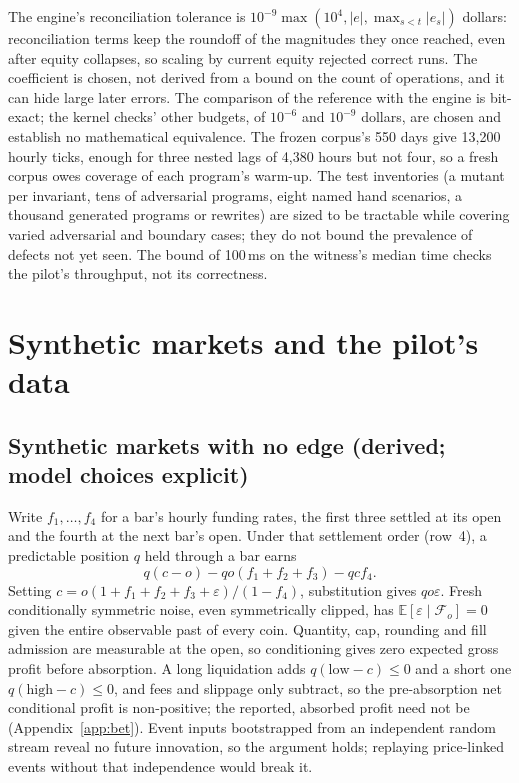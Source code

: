 \documentclass[11pt]{article}
\newcommand{\E}{\mathbb{E}}
\begin{document}
The engine's reconciliation tolerance is $10^{-9}\max(10^4,|e|,\max_{s<t}|e_s|)$ dollars: reconciliation terms keep the roundoff of the magnitudes they once reached, even after equity collapses, so scaling by current equity rejected correct runs. The coefficient is chosen, not derived from a bound on the count of operations, and it can hide large later errors. The comparison of the reference with the engine is bit-exact; the kernel checks' other budgets, of $10^{-6}$ and $10^{-9}$ dollars, are chosen and establish no mathematical equivalence. The frozen corpus's 550 days give 13{,}200 hourly ticks, enough for three nested lags of 4{,}380 hours but not four, so a fresh corpus owes coverage of each program's warm-up. The test inventories (a mutant per invariant, tens of adversarial programs, eight named hand scenarios, a thousand generated programs or rewrites) are sized to be tractable while covering varied adversarial and boundary cases; they do not bound the prevalence of defects not yet seen. The bound of 100\,ms on the witness's median time checks the pilot's throughput, not its correctness.

\section{Synthetic markets and the pilot's data}\label{app:dataapp}

\subsection{Synthetic markets with no edge (derived; model choices explicit)}\label{app:nulls}

Write $f_1,\dots,f_4$ for a bar's hourly funding rates, the first three settled at its open and the fourth at the next bar's open. Under that settlement order (row~4), a predictable position $q$ held through a bar earns
\[
 q(c-o)-qo(f_1+f_2+f_3)-qcf_4.
\]
Setting $c=o(1+f_1+f_2+f_3+\varepsilon)/(1-f_4)$, substitution gives $qo\varepsilon$. Fresh conditionally symmetric noise, even symmetrically clipped, has $\E[\varepsilon\mid\mathcal F_o]=0$ given the entire observable past of every coin. Quantity, cap, rounding and fill admission are measurable at the open, so conditioning gives zero expected gross profit before absorption. A long liquidation adds $q(\mathrm{low}-c)\le0$ and a short one $q(\mathrm{high}-c)\le0$, and fees and slippage only subtract, so the pre-absorption net conditional profit is non-positive; the reported, absorbed profit need not be (Appendix~\ref{app:bet}). Event inputs bootstrapped from an independent random stream reveal no future innovation, so the argument holds; replaying price-linked events without that independence would break it.
\end{document}

